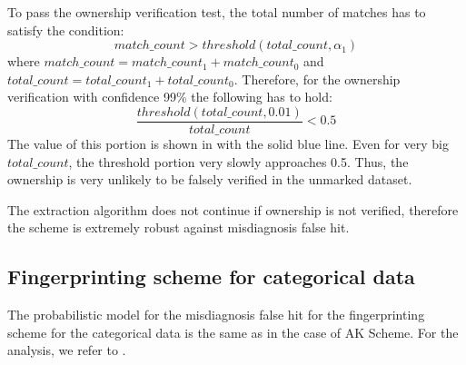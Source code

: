 To pass the ownership verification test, the total number of matches has to satisfy the condition:
\begin{equation}
    match\_count > threshold(total\_count, \alpha_1)
\end{equation}
where $match\_count = match\_count_1 + match\_count_0$ and $total\_count = total\_count_1 + total\_count_0$.
Therefore, for the ownership verification with confidence 99\% the following has to hold:
\begin{equation}
    \frac{threshold(total\_count, 0.01)}{total\_count} < 0.5
\end{equation} 
The value of this portion is shown in  with the solid blue line. 
Even for very big $total\_count$, the threshold portion very slowly approaches 0.5. 
Thus, the ownership is very unlikely to be falsely verified in the unmarked dataset.

The extraction algorithm does not continue if ownership is not verified, therefore the scheme is extremely robust against misdiagnosis false hit.


\subsection{Fingerprinting scheme for categorical data}
The probabilistic model for the misdiagnosis false hit for the fingerprinting scheme for the categorical data is the same as in the case of AK Scheme. For the analysis, we refer to .